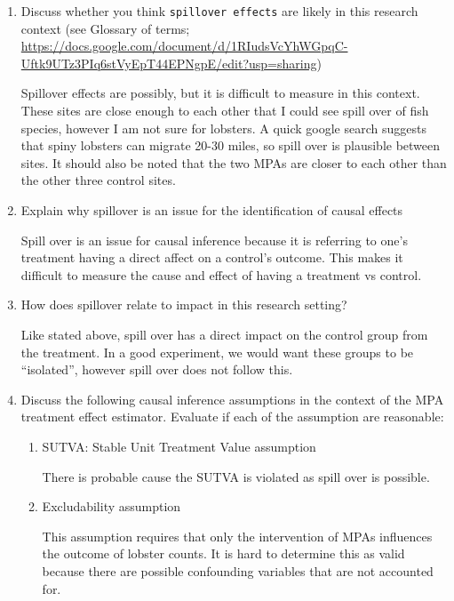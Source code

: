 \documentclass[
]{article}
\begin{document}
\begin{enumerate}
\def\labelenumi{\alph{enumi}.}
\item
  Discuss whether you think \texttt{spillover\ effects} are likely in
  this research context (see Glossary of terms;
  \url{https://docs.google.com/document/d/1RIudsVcYhWGpqC-Uftk9UTz3PIq6stVyEpT44EPNgpE/edit?usp=sharing})

  Spillover effects are possibly, but it is difficult to measure in this
  context. These sites are close enough to each other that I could see
  spill over of fish species, however I am not sure for lobsters. A
  quick google search suggests that spiny lobsters can migrate 20-30
  miles, so spill over is plausible between sites. It should also be
  noted that the two MPAs are closer to each other than the other three
  control sites.
\item
  Explain why spillover is an issue for the identification of causal
  effects

  Spill over is an issue for causal inference because it is referring to
  one's treatment having a direct affect on a control's outcome. This
  makes it difficult to measure the cause and effect of having a
  treatment vs control.
\item
  How does spillover relate to impact in this research setting?

  Like stated above, spill over has a direct impact on the control group
  from the treatment. In a good experiment, we would want these groups
  to be ``isolated'', however spill over does not follow this.
\item
  Discuss the following causal inference assumptions in the context of
  the MPA treatment effect estimator. Evaluate if each of the assumption
  are reasonable:

  \begin{enumerate}
  \def\labelenumii{\arabic{enumii})}
  \item
    SUTVA: Stable Unit Treatment Value assumption

    There is probable cause the SUTVA is violated as spill over is
    possible.
  \item
    Excludability assumption

    This assumption requires that only the intervention of MPAs
    influences the outcome of lobster counts. It is hard to determine
    this as valid because there are possible confounding variables that
    are not accounted for.
  \end{enumerate}
\end{enumerate}
\end{document}
